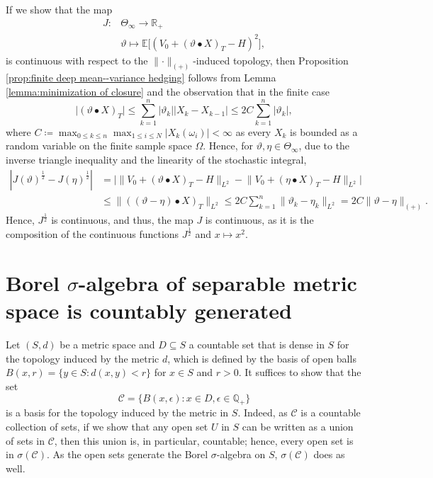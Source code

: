 \documentclass[11pt,a4paper,twoside,openany]{report}
\numberwithin{equation}{section}
\theoremstyle{plain} %
\theoremstyle{definition} %
\theoremstyle{remark} %
\begin{document}
If we show that the map 
\begin{align*}
    J:&\Theta_{\infty}\to\mathbb{R}_+
    \\&\vartheta\mapsto\mathbb{E}\Big[(V_0+(\vartheta\bullet X)_{T}-H)^2\Big],
\end{align*}
is continuous with respect to the \(\lVert\cdot\rVert_{(+)}\)-induced topology, then  
Proposition \ref{prop:finite deep mean--variance hedging} follows from Lemma \ref{lemma:minimization of closure} and the observation that in the finite case 
\begin{equation*}
    \big|(\vartheta\bullet X)_T\big|\leq\sum_{k=1}^{n}|\vartheta_k||X_{k}-X_{k-1}|\leq2C\sum_{k=1}^n|\vartheta_k|,
\end{equation*}
where \(C\coloneqq\max_{0\leq k\leq n}\max_{1\leq i\leq N}|X_k(\omega_i)|<\infty\) as every \(X_k\) is bounded as a random variable on the finite sample space \(\Omega\). Hence, for \(\vartheta,\eta\in\Theta_{\infty}\), due to the inverse triangle inequality and the linearity of the stochastic integral,
\begin{align*}
    |J(\vartheta)^{\frac{1}{2}}-J(\eta)^{\frac{1}{2}}|&=\Big|\lVert V_0+(\vartheta\bullet X)_T-H\rVert_{L^2}-\lVert V_0+(\eta\bullet X)_T-H\rVert_{L^2}\Big|
    \\&\leq\lVert ((\vartheta-\eta)\bullet X)_T\rVert_{L^2}\leq 2C\sum_{k=1}^n\lVert\vartheta_k-\eta_k\rVert_{L^2}=2C\lVert\vartheta-\eta\rVert_{(+)}.
\end{align*}
Hence, \(J^{\frac{1}{2}}\) is continuous, and 
thus, the map \(J\) is continuous, as it is the composition of the continuous functions \(J^{\frac{1}{2}}\) and \(x\mapsto x^2\). 

\section{Borel \(\sigma\)-algebra of separable metric space is countably generated}\label{Appendix:Borel sigma-algebra of separable metric space is countably generated}
Let \((S,d)\) be a metric space and \(D\subseteq S\) a countable set that is dense in \(S\) for the topology induced by the metric \(d\), which is defined by the basis of open balls \(B(x,r)=\{y\in S:d(x,y)<r\}\) for \(x\in S\) and \(r>0\).
 It suffices to show that the set 
 \begin{equation*}
     \mathcal{C}=\{B(x,\epsilon):x\in D,\epsilon\in\mathbb{Q}_+\}
 \end{equation*}
is a basis for the topology induced by the metric in \(S\). Indeed, as \(\mathcal{C}\) is a countable collection of sets, if we show that any open set \(U\) in \(S\) can be written as a union of sets in \(\mathcal{C}\), then this union is, in particular, countable; hence, every open set is in \(\sigma(\mathcal{C})\). As the open sets generate the Borel \(\sigma\)-algebra on \(S\), \(\sigma(\mathcal{C})\) does as well.
\end{document}

